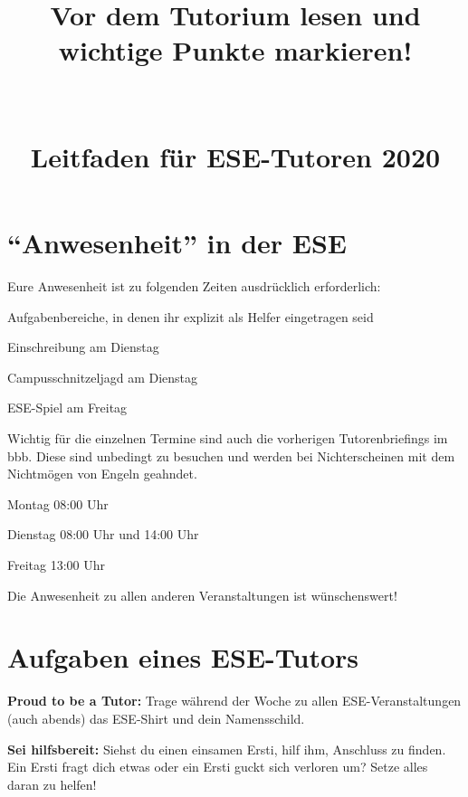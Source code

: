 \documentclass[a4paper,12pt]{scrreprt}
\begin{document}
\title{\huge{\textbf{Vor dem Tutorium lesen und wichtige Punkte markieren!}}\\\ \\\ \\{Leitfaden für ESE-Tutoren 2020}}


\date{}

\author{}
\maketitle

\section*{\enquote{Anwesenheit} in der ESE}
Eure Anwesenheit ist zu folgenden Zeiten ausdrücklich erforderlich:
\begin{itemize*}
    \item Aufgabenbereiche, in denen ihr explizit als Helfer eingetragen seid
    \item Einschreibung am Dienstag
    \item Campusschnitzeljagd am Dienstag
    \item ESE-Spiel am Freitag
\end{itemize*}
Wichtig für die einzelnen Termine sind auch die vorherigen Tutorenbriefings im bbb. Diese sind unbedingt zu besuchen und werden bei Nichterscheinen mit dem Nichtmögen von Engeln geahndet.\\
\begin{itemize*}
    \item Montag        08:00 Uhr
    \item Dienstag      08:00 Uhr und 14:00 Uhr
    \item Freitag       13:00 Uhr
\end{itemize*}

Die Anwesenheit zu allen anderen Veranstaltungen ist wünschenswert!

\section*{Aufgaben eines ESE-Tutors}

\begin{itemize*}
    \item \textbf{Proud to be a Tutor:} Trage während der Woche zu allen ESE-Veranstaltungen (auch abends) das ESE-Shirt und dein Namensschild.
    \item \textbf{Sei hilfsbereit:} Siehst du einen einsamen Ersti, hilf ihm, Anschluss zu finden. Ein Ersti fragt dich etwas oder ein Ersti guckt sich verloren um? Setze alles daran zu helfen!
\end{itemize*}
\end{document}
